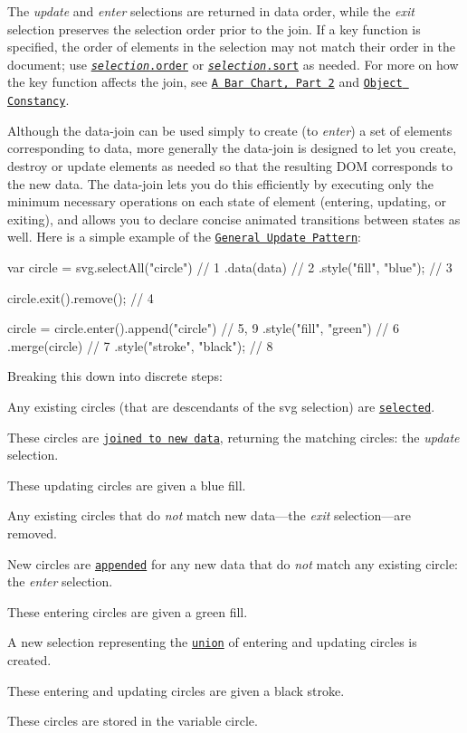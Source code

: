 The {\itshape update} and {\itshape enter} selections are returned in data order, while the {\itshape exit} selection preserves the selection order prior to the join. If a key function is specified, the order of elements in the selection may not match their order in the document; use \href{#order}{\tt {\itshape selection}.order} or \href{#sort}{\tt {\itshape selection}.sort} as needed. For more on how the key function affects the join, see \href{http://bost.ocks.org/mike/bar/2/}{\tt A Bar Chart, Part 2} and \href{http://bost.ocks.org/mike/constancy/}{\tt Object Constancy}.

Although the data-\/join can be used simply to create (to {\itshape enter}) a set of elements corresponding to data, more generally the data-\/join is designed to let you create, destroy or update elements as needed so that the resulting D\+OM corresponds to the new data. The data-\/join lets you do this efficiently by executing only the minimum necessary operations on each state of element (entering, updating, or exiting), and allows you to declare concise animated transitions between states as well. Here is a simple example of the \href{http://bl.ocks.org/mbostock/3808218}{\tt General Update Pattern}\+:


\begin{DoxyCode}
var circle = svg.selectAll("circle") // 1
  .data(data) // 2
    .style("fill", "blue"); // 3

circle.exit().remove(); // 4

circle = circle.enter().append("circle") // 5, 9
    .style("fill", "green") // 6
  .merge(circle) // 7
    .style("stroke", "black"); // 8
\end{DoxyCode}


Breaking this down into discrete steps\+:


\begin{DoxyEnumerate}
\item Any existing circles (that are descendants of the {\ttfamily svg} selection) are \href{#selection_selectAll}{\tt selected}.
\item These circles are \href{#selection_data}{\tt joined to new {\ttfamily data}}, returning the matching circles\+: the {\itshape update} selection.
\item These updating circles are given a blue fill.
\item Any existing circles that do {\itshape not} match new data—the {\itshape exit} selection—are removed.
\item New circles are \href{#selection_append}{\tt appended} for any new data that do {\itshape not} match any existing circle\+: the {\itshape enter} selection.
\item These entering circles are given a green fill.
\item A new selection representing the \href{#selection_merge}{\tt union} of entering and updating circles is created.
\item These entering and updating circles are given a black stroke.
\item These circles are stored in the variable {\ttfamily circle}.
\end{DoxyEnumerate}

